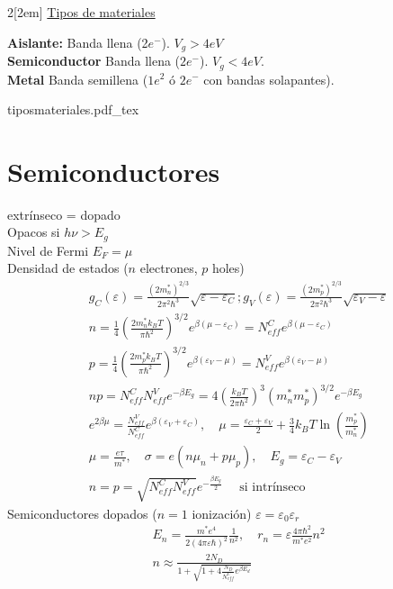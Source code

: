 \documentclass[leqno]{article}
\newcommand{\incfig}[1]{%
\begin{center}
\def\svgwidth{0.9\columnwidth}
{#1.pdf_tex}
\end{center}
}
\begin{document}
\begin{multicols}{2}[\columnsep2em]
\underline{Tipos de materiales}

\textbf{Aislante:} Banda llena (2$e^-$). $V_g>4eV$\\
\textbf{Semiconductor} Banda llena ($2e^-$).  $V_g<4eV$.\\
\textbf{Metal} Banda semillena ($1e^2$ ó $2e^-$ con bandas solapantes).

\incfig{tiposmateriales}

\section{Semiconductores}
extrínseco = dopado\\
Opacos si $h \nu > E_g$\\
Nivel de Fermi $E_F = \mu$\\
Densidad de estados ($n$ electrones, $p$ holes)
\begin{align*}
&g_C(\varepsilon ) = \frac{(2m^*_n) ^{2 /3}}{2\pi ^2\hbar ^3}\sqrt{\varepsilon -\varepsilon _C} ; 
g_V(\varepsilon ) = \frac{(2m^*_p) ^{2 /3}}{2\pi ^2\hbar ^3}\sqrt{\varepsilon _V-\varepsilon } \\
&n = \frac{1}{4}\left(\frac{2 m^*_nk_BT}{\pi \hbar ^2}\right)^{3 /2} e ^{\beta(\mu -\varepsilon _C)} = N_{eff}^C e ^{\beta (\mu -\varepsilon _C)}\\
&p = \frac{1}{4}\left(\frac{2 m^*_pk_BT}{\pi \hbar ^2}\right)^{3 /2} e ^{\beta(\varepsilon _V-\mu )} = N_{eff}^V e ^{\beta (\varepsilon _V-\mu )}\\
& np = N_{eff}^CN_{eff}^V e ^{-\beta E_g} = 4 \left(\frac{k_BT}{2\pi \hbar ^2}\right)^3(m_n^*m_p^*)^{3 / 2}e ^{-\beta E_g}\\
& e ^{2\beta \mu } = \frac{N_{eff}^V}{N_{eff}^C} e ^{\beta (\varepsilon _V + \varepsilon _C)}, \quad
\mu  = \frac{\varepsilon _C+\varepsilon _V}{2} + \frac{3}{4}k_BT\ln\left( \frac{m_p^*}{m_n^*} \right) \\
& \mu = \frac{e\tau }{m^*}, \quad \sigma  = e(n\mu _n+ p\mu _p), \quad E_g = \varepsilon _C-\varepsilon _V\\
& n = p = \sqrt{N_{eff}^CN^V_{eff}}e ^{-\frac{\beta E_g}{2}} \quad \text{ si intrínseco}
\end{align*}
Semiconductores dopados ($n=1$ ionización) $\varepsilon = \varepsilon _0\varepsilon_r$
\begin{align*}
  &E_n = \frac{m^*e^4}{2(4\pi \varepsilon \hbar )^2} \frac{1}{n^2}, \quad r_n = \varepsilon \frac{4\pi \hbar ^2}{m^*e^2}n^2\\
  &n \approx \frac{2N_D}{1+\sqrt{1+4 \frac{N_D}{N_{eff}^C} e ^{\beta E_d} }} 

\end{align*}
\end{multicols}
\end{document}
